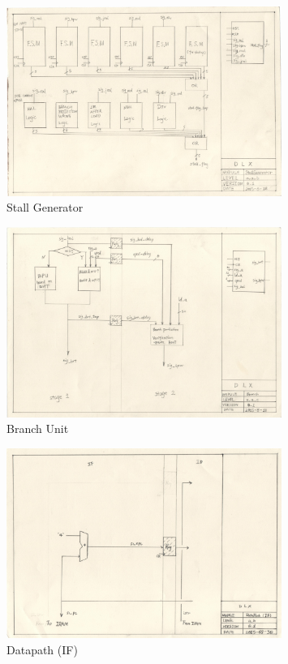 \begin{figure}[Ht]
    \centering
    \includegraphics[width=0.8\textwidth]{fig/sg.jpg}
    \caption{Stall Generator}
    \label{fig:sg}
\end{figure}
\begin{figure}[Ht]
    \centering
    \includegraphics[width=0.8\textwidth]{fig/br.jpg}
    \caption{Branch Unit}
    \label{fig:br}
\end{figure}
\begin{figure}[Ht]
    \centering
    \includegraphics[width=0.8\textwidth]{fig/dp1.jpg}
    \caption{Datapath (IF)}
    \label{fig:dp1}
\end{figure}
